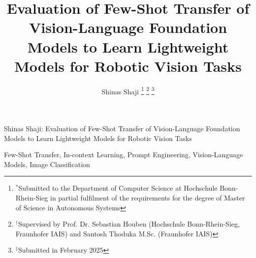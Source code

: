 \documentclass[lettersize,journal]{IEEEtran}
\begin{document}
\title{Evaluation of Few-Shot Transfer of Vision-Language Foundation Models to Learn Lightweight Models for Robotic Vision Tasks}

\author{Shinas Shaji
\thanks{$^*$Submitted to the Department of Computer Science at Hochschule Bonn-Rhein-Sieg in partial fulfilment of the requirements for the degree of Master of Science in Autonomous Systems}
\thanks{$^{\dagger}$Supervised by Prof. Dr. Sebastian Houben (Hochschule Bonn-Rhein-Sieg, Fraunhofer IAIS) and Santosh Thoduka M.Sc. (Fraunhofer IAIS)}
\thanks{$^{\ddagger}$Submitted in February 2025}} %

%
{Shinas Shaji: Evaluation of Few-Shot Transfer of Vision-Language Foundation Models to Learn Lightweight Models for Robotic Vision Tasks}

\maketitle



\begin{IEEEkeywords}
Few-Shot Transfer, In-context Learning, Prompt Engineering, Vision-Language Models, Image Classification
\end{IEEEkeywords}

\glsresetall



% 









\printglossaries

\end{document}
